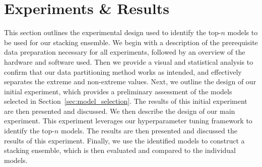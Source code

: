 \section{Experiments \& Results}\label{sec:methodology}
This section outlines the experimental design used to identify the top-$n$ models to be used for our stacking ensemble.
We begin with a description of the prerequisite data preparation necessary for all experiments, followed by an overview of the hardware and software used.
Then we provide a visual and statistical analysis to confirm that our data partitioning method works as intended, and effectively separates the extreme and non-extreme values.
Next, we outline the design of our initial experiment, which provides a preliminary assessment of the models selected in Section~\ref{sec:model_selection}.
The results of this initial experiment are then presented and discussed.
We then describe the design of our main experiment.
This experiment leverages our hyperparameter tuning framework to identify the top-$n$ models. 
The results are then presented and discussed the results of this experiment.
Finally, we use the identified models to construct a stacking ensemble, which is then evaluated and compared to the individual models.









